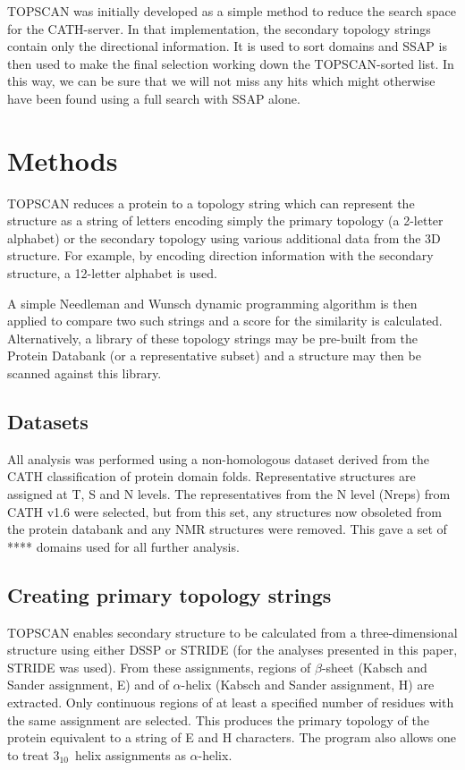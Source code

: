 \documentclass{article}
\newcommand{\htt}{\mbox{$3_{10}$}}
\begin{document}
TOPSCAN was initially developed as a simple method to reduce the
search space for the CATH-server. In that implementation, the secondary
topology strings contain only the directional information.  It is used
to sort domains and SSAP is then used to make the final selection
working down the TOPSCAN-sorted list. In this way, we can be sure that
we will not miss any hits which might otherwise have been found using
a full search with SSAP alone.


\section{Methods}
TOPSCAN reduces a protein to a topology string which can represent the
structure as a string of letters encoding simply the primary topology
(a 2-letter alphabet) or the secondary topology using various
additional data from the 3D structure. For example, by encoding
direction information with the secondary structure, a 12-letter
alphabet is used.

A simple Needleman and Wunsch dynamic programming algorithm is then
applied to compare two such strings and a score for the similarity is
calculated. Alternatively, a library of these topology strings may be
pre-built from the Protein Databank (or a representative subset) and a
structure may then be scanned against this library.

\subsection{Datasets}
All analysis was performed using a non-homologous dataset derived from
the CATH classification of protein domain folds. Representative
structures are assigned at T, S and N levels. The representatives from
the N level (Nreps) from CATH v1.6 were selected, but from this set,
any structures now obsoleted from the protein databank and any NMR
structures were removed. This gave a set of **** domains used for all
further analysis.


\subsection{Creating primary topology strings}
TOPSCAN enables secondary structure to be calculated from a
three-dimensional structure using either DSSP or STRIDE (for the
analyses presented in this paper, STRIDE was used).  From these
assignments, regions of $\beta$-sheet (Kabsch and Sander assignment,
E) and of $\alpha$-helix (Kabsch and Sander assignment, H) are
extracted. Only continuous regions of at least a specified number of
residues with the same assignment are selected.  This produces the
primary topology of the protein equivalent to a string of E and H
characters. The program also allows one to treat \htt\ helix
assignments as $\alpha$-helix.
\end{document}
